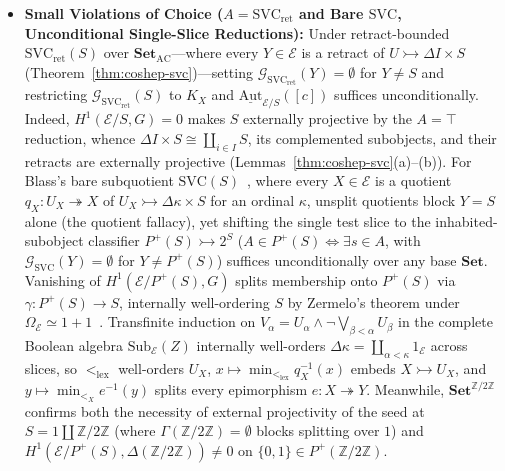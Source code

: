 \begin{itemize}
  \item \textbf{Small Violations of Choice ($A = \mathrm{SVC}_{\mathrm{ret}}$ and Bare $\mathrm{SVC}$, Unconditional Single-Slice Reductions):} Under retract-bounded $\mathrm{SVC}_{\mathrm{ret}}(S)$ over $\mathbf{Set}_{\mathrm{AC}}$---where every $Y \in \mathcal{E}$ is a retract of $U \rightarrowtail \Delta I \times S$ (Theorem~\ref{thm:coshep-svc})---setting $\mathcal{G}_{\mathrm{SVC}_{\mathrm{ret}}}(Y) = \emptyset$ for $Y \neq S$ and restricting $\mathcal{G}_{\mathrm{SVC}_{\mathrm{ret}}}(S)$ to $K_X$ and $\underline{\mathrm{Aut}}_{\mathcal{E}/S}([c])$ suffices unconditionally. Indeed, $H^1(\mathcal{E}/S, G) = 0$ makes $S$ externally projective by the $A = \top$ reduction, whence $\Delta I \times S \cong \coprod_{i \in I} S$, its complemented subobjects, and their retracts are externally projective (Lemmas~\ref{thm:coshep-svc}(a)--(b)). For Blass's bare subquotient $\mathrm{SVC}(S)$~\cite{Blass79}, where every $X \in \mathcal{E}$ is a quotient $q_X : U_X \twoheadrightarrow X$ of $U_X \rightarrowtail \Delta\kappa \times S$ for an ordinal $\kappa$, unsplit quotients block $Y = S$ alone (the quotient fallacy), yet shifting the single test slice to the inhabited-subobject classifier $P^+(S) \rightarrowtail 2^S$ ($A \in P^+(S) \iff \exists s \in A$, with $\mathcal{G}_{\mathrm{SVC}}(Y) = \emptyset$ for $Y \neq P^+(S)$) suffices unconditionally over any base $\mathbf{Set}$. Vanishing of $H^1(\mathcal{E}/P^+(S), G)$ splits membership onto $P^+(S)$ via $\gamma : P^+(S) \to S$, internally well-ordering $S$ by Zermelo's theorem under $\Omega_{\mathcal{E}} \simeq 1+1$~\cite[\S D4.5]{Johnstone02}. Transfinite induction on $V_\alpha = U_\alpha \wedge \neg \bigvee_{\beta < \alpha} U_\beta$ in the complete Boolean algebra $\mathrm{Sub}_{\mathcal{E}}(Z)$ internally well-orders $\Delta\kappa = \coprod_{\alpha < \kappa} 1_{\mathcal{E}}$ across slices, so $<_{\mathrm{lex}}$ well-orders $U_X$, $x \mapsto \min_{<_{\mathrm{lex}}} q_X^{-1}(x)$ embeds $X \rightarrowtail U_X$, and $y \mapsto \min_{<_X} e^{-1}(y)$ splits every epimorphism $e : X \twoheadrightarrow Y$. Meanwhile, $\mathbf{Set}^{\mathbb{Z}/2\mathbb{Z}}$ confirms both the necessity of external projectivity of the seed at $S = 1 \amalg \mathbb{Z}/2\mathbb{Z}$ (where $\Gamma(\mathbb{Z}/2\mathbb{Z}) = \emptyset$ blocks splitting over $1$) and $H^1(\mathcal{E}/P^+(S), \Delta(\mathbb{Z}/2\mathbb{Z})) \neq 0$ on $\{0,1\} \in P^+(\mathbb{Z}/2\mathbb{Z})$.

\end{itemize}

